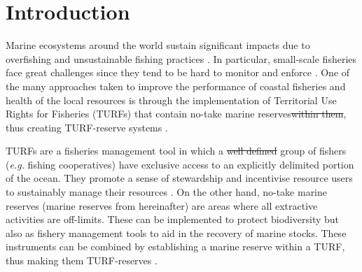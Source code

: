 \documentclass{frontiersSCNS}
\providecommand{\DIFaddtex}[1]{{\protect\color{blue}\uwave{#1}}} %
\providecommand{\DIFdeltex}[1]{{\protect\color{red}\sout{#1}}}                      %
\providecommand{\DIFaddbegin}{} %
\providecommand{\DIFaddend}{} %
\providecommand{\DIFdelbegin}{} %
\providecommand{\DIFdelend}{} %
\providecommand{\DIFadd}[1]{\texorpdfstring{\DIFaddtex{#1}}{#1}} %
\providecommand{\DIFdel}[1]{\texorpdfstring{\DIFdeltex{#1}}{}} %
\begin{document}
\hypertarget{introduction}{%
\section{Introduction}\label{introduction}}

Marine ecosystems around the world sustain significant impacts due to
overfishing and unsustainable fishing practices
\citep{pauly_2005-qV,worm_2006-IB,halpern_2008-dK}. In particular,
small-scale fisheries face great challenges since they tend to be hard
to monitor and enforce \citep{costello_2012}. One of the many approaches
taken to improve the performance of coastal fisheries and health of the
local resources is through the implementation of Territorial Use Rights
for Fisheries (TURFs) that contain no-take marine reserves\DIFdelbegin \DIFdel{within them}\DIFdelend , thus
creating TURF-reserve systems
\citep{afflerbach_2014,gelcich_2015,lester_2017}.

TURFs are a fisheries management tool in which a \DIFdelbegin \DIFdel{well defined }\DIFdelend \DIFaddbegin \DIFadd{well-defined }\DIFaddend group of
fishers (\emph{e.g.} fishing cooperatives) have exclusive access to an
explicitly delimited portion of the ocean. They promote a sense of
stewardship and incentivise resource users to sustainably manage their
resources \citep{gelcich_2008,costello_2010,mccay_2014}. On the other
hand, no-take marine reserves (marine reserves from hereinafter) are
areas where all extractive activities are off-limits. These can be
implemented to protect biodiversity but also as fishery management tools
to aid in the recovery of marine stocks. These instruments can be
combined by establishing a marine reserve within a TURF, thus making
them TURF-reserves \citep{afflerbach_2014,gelcich_2015,lester_2017}.
\end{document}
